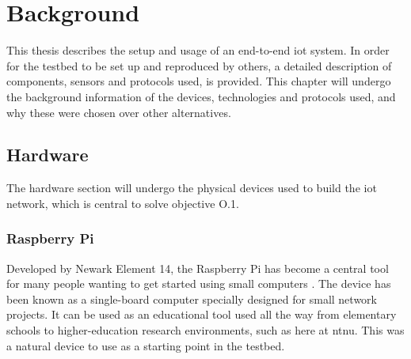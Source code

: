 \chapter{Background}
\label{chp:background} 

\noindent This thesis describes the setup and usage of an end-to-end \gls{iot} system. In order for the testbed to be set up and reproduced by others, a detailed description of components, sensors and protocols used, is provided. This chapter will undergo the background information of the devices, technologies and protocols used, and why these were chosen over other alternatives.  





\section{Hardware}

\noindent The hardware section will undergo the physical devices used to build the \gls{iot} network, which is central to solve objective O.1. 

\subsection{Raspberry Pi}

\noindent Developed by Newark Element 14, the Raspberry Pi has become a central tool for many people wanting to get started using small computers \cite{newark}. The device has been known as a single-board computer specially designed for small network projects. It can be used as an educational tool used all the way from elementary schools to higher-education research environments, such as here at \gls{ntnu}. This was a natural device to use as a starting point in the testbed. 

